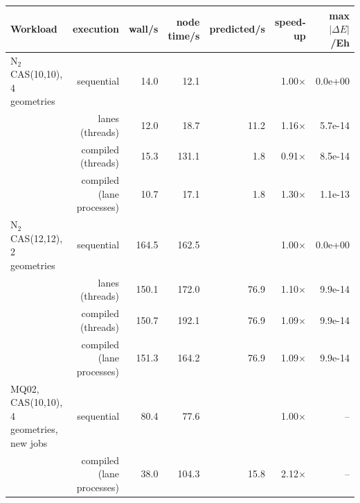 \begin{tabular}{lrrrrrr}
\toprule
Workload & execution & wall/s & node time/s & predicted/s & speed-up & max $|\Delta E|$/Eh \\
\midrule
N$_2$ CAS(10,10), 4 geometries & sequential & 14.0 & 12.1 &  & 1.00$\times$ & 0.0e+00 \\
 & lanes (threads) & 12.0 & 18.7 & 11.2 & 1.16$\times$ & 5.7e-14 \\
 & compiled (threads) & 15.3 & 131.1 & 1.8 & 0.91$\times$ & 8.5e-14 \\
 & compiled (lane processes) & 10.7 & 17.1 & 1.8 & 1.30$\times$ & 1.1e-13 \\
\midrule
N$_2$ CAS(12,12), 2 geometries & sequential & 164.5 & 162.5 &  & 1.00$\times$ & 0.0e+00 \\
 & lanes (threads) & 150.1 & 172.0 & 76.9 & 1.10$\times$ & 9.9e-14 \\
 & compiled (threads) & 150.7 & 192.1 & 76.9 & 1.09$\times$ & 9.9e-14 \\
 & compiled (lane processes) & 151.3 & 164.2 & 76.9 & 1.09$\times$ & 9.9e-14 \\
\midrule
MQ02, CAS(10,10), 4 geometries, new jobs & sequential & 80.4 & 77.6 &  & 1.00$\times$ & -- \\
 & compiled (lane processes) & 38.0 & 104.3 & 15.8 & 2.12$\times$ & -- \\
\bottomrule
\end{tabular}
